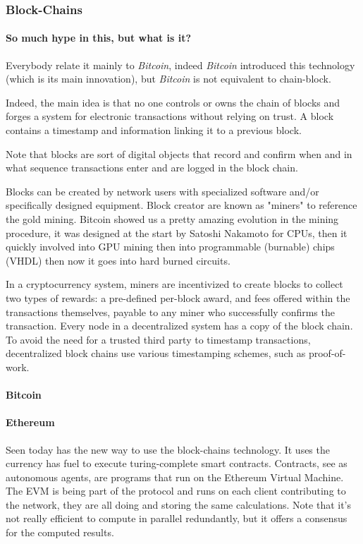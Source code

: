 \subsubsection{Block-Chains}
\paragraph{So much hype in this, but what is it?}
Everybody relate it mainly to \textit{Bitcoin}\cite{SatoshiNakamoto2008Bitcoin:System}, indeed \textit{Bitcoin} introduced this technology (which is its main innovation), but \textit{Bitcoin} is not equivalent to chain-block.

Indeed, the main idea is that no one controls or owns the chain of blocks and forges a system for electronic transactions without relying on trust. A block contains a timestamp and information linking it to a previous block.

Note that blocks are sort of digital objects that record and confirm when and in what sequence transactions enter and are logged in the block chain. 

Blocks can be created by network users with specialized software and/or specifically designed equipment. Block creator are known as "miners" to reference the gold mining. Bitcoin showed us a pretty amazing evolution in the mining procedure, it was designed at the start by Satoshi Nakamoto for CPUs, then it quickly involved into GPU mining then into programmable (burnable) chips (VHDL) then now it goes into hard burned circuits.

In a cryptocurrency system, miners are incentivized to create blocks to collect two types of rewards: a pre-defined per-block award, and fees offered within the transactions themselves, payable to any miner who successfully confirms the transaction.
Every node in a decentralized system has a copy of the block chain. To avoid the need for a trusted third party to timestamp transactions, decentralized block chains use various timestamping schemes, such as proof-of-work.
\paragraph{Bitcoin \cite{SatoshiNakamoto2008Bitcoin:System}}
\paragraph{Ethereum}
Seen today has the new way to use the block-chains technology. It uses the currency has fuel to execute turing-complete smart contracts. Contracts, see as autonomous agents, are programs that run on the Ethereum Virtual Machine. The EVM is being part of the protocol and runs on each client contributing to the network, they are all doing and storing the same calculations. Note that it's not really efficient to compute in parallel redundantly, but it offers a consensus for the computed results. 
